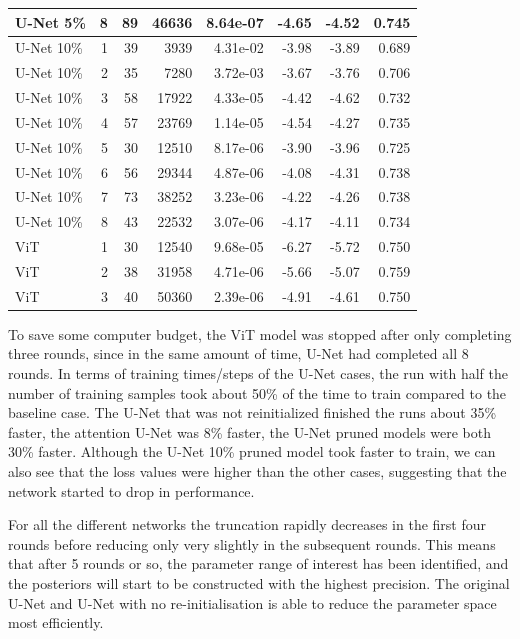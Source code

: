 \begin{table}[htb]
{\begin{tabular}{@{}lrrrrrrr@{}}
U-Net 5\% & 8 & 89 & 46636 & 8.64e-07 & -4.65 & -4.52 & 0.745 \\
\midrule
U-Net 10\% & 1 & 39 & 3939 & 4.31e-02 & -3.98 & -3.89 & 0.689 \\
U-Net 10\% & 2 & 35 & 7280 & 3.72e-03 & -3.67 & -3.76 & 0.706 \\
U-Net 10\% & 3 & 58 & 17922 & 4.33e-05 & -4.42 & -4.62 & 0.732 \\
U-Net 10\% & 4 & 57 & 23769 & 1.14e-05 & -4.54 & -4.27 & 0.735 \\
U-Net 10\% & 5 & 30 & 12510 & 8.17e-06 & -3.90 & -3.96 & 0.725 \\
U-Net 10\% & 6 & 56 & 29344 & 4.87e-06 & -4.08 & -4.31 & 0.738 \\
U-Net 10\% & 7 & 73 & 38252 & 3.23e-06 & -4.22 & -4.26 & 0.738 \\
U-Net 10\% & 8 & 43 & 22532 & 3.07e-06 & -4.17 & -4.11 & 0.734 \\
\midrule
ViT & 1 & 30 & 12540 & 9.68e-05 & -6.27 & -5.72 & 0.750 \\
ViT & 2 & 38 & 31958 & 4.71e-06 & -5.66 & -5.07 & 0.759 \\
ViT & 3 & 40 & 50360 & 2.39e-06 & -4.91 & -4.61 & 0.750 \\

\bottomrule
\end{tabular}}
\myvspacecommand
\end{table}

To save some computer budget, the ViT model was stopped after only completing three rounds, since in the same amount of time, U-Net had completed all 8 rounds. In terms of training times/steps of the U-Net cases, the run with half the number of training samples took about 50\% of the time to train compared to the baseline case. The U-Net that was not reinitialized finished the runs about 35\% faster, the attention U-Net was 8\% faster, the U-Net pruned models were both 30\% faster. Although the U-Net 10\% pruned model took faster to train, we can also see that the loss values were higher than the other cases, suggesting that the network started to drop in performance.

For all the different networks the truncation rapidly decreases in the first four rounds before reducing only very slightly in the subsequent rounds. This means that after 5 rounds or so, the parameter range of interest has been identified, and the posteriors will start to be constructed with the highest precision. The original U-Net and U-Net with no re-initialisation is able to reduce the parameter space most efficiently. 

